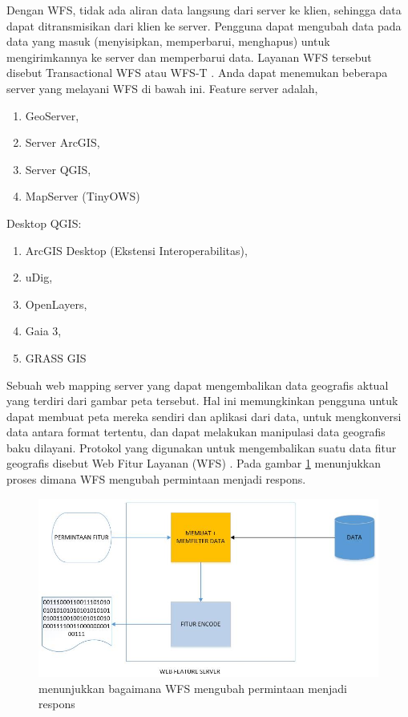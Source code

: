 Dengan WFS, tidak ada aliran data langsung dari server ke klien, sehingga data dapat ditransmisikan dari klien ke server. Pengguna dapat mengubah data pada data yang masuk (menyisipkan, memperbarui, menghapus) untuk mengirimkannya ke server dan memperbarui data. Layanan WFS tersebut disebut Transactional WFS atau WFS-T \cite{khair2016pembuatan}. Anda dapat menemukan beberapa server yang melayani WFS di bawah ini.
Feature server adalah,
\begin{enumerate}
\item GeoServer,
\item Server ArcGIS,
\item Server QGIS,
\item MapServer (TinyOWS)
\end{enumerate}

Desktop QGIS:
\begin{enumerate}
\item ArcGIS Desktop (Ekstensi Interoperabilitas),
\item uDig,
\item OpenLayers,
\item Gaia 3,
\item GRASS GIS
\end{enumerate}

Sebuah web mapping server yang dapat mengembalikan data geografis aktual yang terdiri dari gambar peta tersebut. Hal ini memungkinkan pengguna untuk dapat membuat peta mereka sendiri dan aplikasi dari data, untuk mengkonversi data antara format tertentu, dan dapat melakukan manipulasi data geografis baku dilayani. Protokol yang digunakan untuk mengembalikan suatu data fitur geografis disebut Web Fitur Layanan (WFS) \cite{purab2015penyajian}. Pada gambar \ref{labelgambar1} menunjukkan proses dimana WFS mengubah permintaan menjadi respons.

\begin{figure}[htbp]
\centering
\includegraphics[width=1\textwidth]{pictures/WFS_RSPN}
\caption{menunjukkan bagaimana WFS mengubah permintaan menjadi respons}
\label{labelgambar1}
\end{figure}